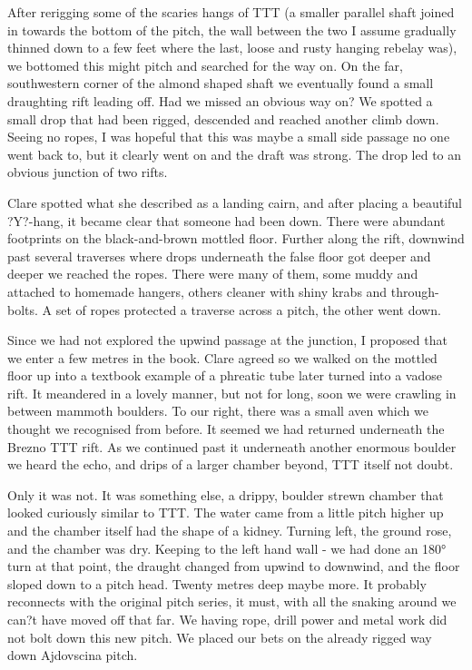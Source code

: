 \documentclass[onecolumn]{book}
\begin{document}
After rerigging some of the scaries hangs of TTT (a smaller parallel shaft joined in towards the bottom of the pitch, the wall between the two I assume gradually thinned down to a few feet where the last, loose and rusty hanging rebelay was), we bottomed this might pitch and searched for the way on. On the far, southwestern corner of the almond shaped shaft  we eventually found a small draughting rift leading off. Had we missed an obvious way on? We spotted a small drop that had been rigged, descended and reached another climb down. Seeing no ropes, I was hopeful that this was maybe a small side passage no one went back to, but it clearly went on and the draft was strong. The drop led to an obvious junction of two rifts.

Clare spotted what she described as a landing cairn, and after placing a beautiful ?Y?-hang, it became clear that someone had been down. There were abundant footprints on the black-and-brown mottled floor. Further along the rift, downwind past several traverses where drops underneath the false floor got deeper and deeper we reached the ropes. There were many of them, some muddy and attached to homemade hangers, others cleaner with shiny krabs and through-bolts. A set of ropes protected a traverse across a pitch, the other went down.

Since we had not explored the upwind passage at the junction, I proposed that we enter a few metres in the book. Clare agreed so we walked on the mottled floor up into a textbook example of a phreatic tube later turned into a vadose rift. It meandered in a lovely manner, but not for long, soon we were crawling in between mammoth boulders. To our right, there was a small aven which we thought we recognised from before. It seemed we had returned underneath the Brezno TTT rift. As we continued past it underneath another enormous boulder we heard the echo, and drips of a larger chamber beyond, TTT itself not doubt.

Only it was not. It was something else, a drippy, boulder strewn chamber that looked curiously similar to TTT. The water came from a little pitch higher up and the chamber itself had the shape of a kidney. Turning left, the ground rose, and the chamber was dry. Keeping to the left hand wall - we had done an 180° turn at that point, the draught changed from upwind to downwind, and the floor sloped down to a pitch head. Twenty metres deep maybe more. It probably reconnects with the original pitch series, it must, with all the snaking around we can?t have moved off that far. We having rope, drill power and metal work did not bolt down this new pitch. We placed our bets on the already rigged way down Ajdovscina pitch. 
\end{document}
